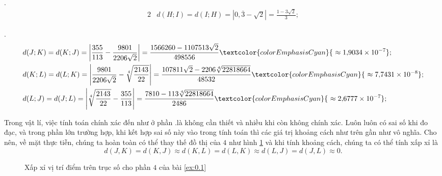 . \begin{alignat*}{2}
      &d(H;I) = d(I;H) = \left|0{,}\overline{3} - \sqrt{2}\right| = \frac{1-3\sqrt{2}}{3};
\end{alignat*}

. \begin{alignat*}{2}
      &d(J;K) = d(K;J) = \left|\frac{355}{113} - \frac{9801}{2206\sqrt{2}}\right| = \frac{1566260-1107513\sqrt{2}}{498556} \textcolor{colorEmphasisCyan}{~\approx 1{,}9034\times 10^{-7}}; \\
      &d(K;L) = d(L;K) = \left|\frac{9801}{2206\sqrt{2}} - \sqrt[4]{\frac{2143}{22}}\right| = \frac{107811\sqrt{2}-2206\sqrt[4]{22818664}}{48532} \textcolor{colorEmphasisCyan}{~\approx 7{,}7431\times 10^{-8}}; \\
      &d(L;J) = d(J;L) = \left|\sqrt[4]{\frac{2143}{22}} - \frac{355}{113}\right| = \frac{7810-113\sqrt[4]{22818664}}{2486} \textcolor{colorEmphasisCyan}{~\approx 2{,}6777\times 10^{-7}};
\end{alignat*}

Trong vật lí, việc tính toán chính xác đến như ở phần .là không cần thiết và nhiều khi còn không chính xác. Luôn luôn có sai số khi đo đạc, và trong phần lớn trường hợp, khi kết hợp sai số này vào trong tính toán thì các giá trị khoảng cách như trên gần như vô nghĩa. Cho nên, về mặt thực tiễn, chúng ta hoàn toàn có thể thay thế đồ thị của $4$ như hình \ref{fig:do_thi:truc_so:truc_so_bon_xx} và khi tính khoảng cách, chúng ta có thể tính xấp xỉ là $$d(J,K) = d(K,J) \approx d(K,L) = d(L,K) \approx d(L,J) = d(J,L) \approx 0.$$

\begin{figure}[H]
   \centering
   \caption{Xấp xỉ vị trí điểm trên trục số cho phần $4$ của bài \ref{ex:0.1}}
   \label{fig:do_thi:truc_so:truc_so_bon_xx}
\end{figure}

